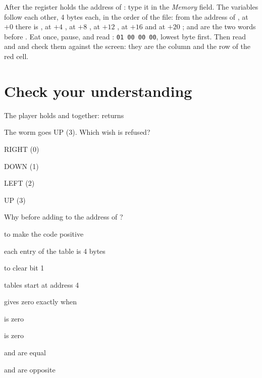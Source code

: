 After  the register  holds the address of
: type it in the \emph{Memory} field. The variables follow each
other, 4 bytes each, in the order of the file: from the address of ,
at $+0$ there is , at $+4$ , at $+8$ , at
$+12$ , at $+16$  and at $+20$ ;
 and  are the two words before . Eat
once, pause, and read : \texttt{01 00 00 00}, lowest byte first.
Then read  and  and check them against the screen:
they are the column and the row of the red cell.



\section{Check your understanding}

\begin{quiz}{The player holds  and  together:  returns}
\item {}
\item {}
\item {}
\item {}
\end{quiz}

\begin{quiz}{The worm goes UP (3). Which wish is refused?}
\item RIGHT (0)
\item DOWN (1)
\item LEFT (2)
\item UP (3)
\end{quiz}

\begin{quiz}{Why  before adding to the address of ?}
\item to make the code positive
\item each entry of the table is 4 bytes
\item to clear bit 1
\item tables start at address 4
\end{quiz}

\begin{quiz}{ gives zero exactly when}
\item {} is zero
\item {} is zero
\item {} and  are equal
\item {} and  are opposite
\end{quiz}

